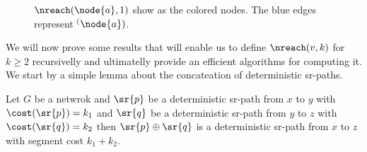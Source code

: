 \begin{figure}[H]
\begin{center}
\begin{tikzpicture}


\end{tikzpicture}
\end{center}
\label{fig:reach1}
\caption{$\nreach(\node{a}, 1)$ show as the colored nodes. The blue edges represent $\sp(\node{a})$.}
\end{figure}

We will now prove some results that will enable us to define
$\nreach(v, k)$ for $k \geq 2$ recursivelly and ultimatelly provide
an efficient algorithms for computing it. We start by a simple lemma
about the concateation of deterministic sr-paths.


\begin{lemma}
\label{lemma:deterministic-concat}
Let $G$ be a netwrok and $\sr{p}$ be a deterministic sr-path from
$x$ to $y$ with $\cost(\sr{p}) = k_1$
and $\sr{q}$ be a deterministic sr-path from $y$ to $z$ with 
$\cost(\sr{q}) = k_2$ then $\sr{p} \oplus \sr{q}$ is a deterministic sr-path
from $x$ to $z$ with segment cost $k_1 + k_2$.
\end{lemma}

